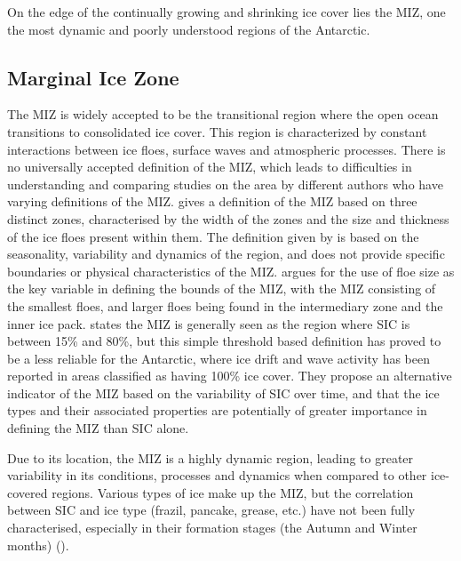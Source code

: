 On the edge of the continually growing and shrinking ice cover lies the \ac{MIZ}, one the most dynamic and poorly understood regions of the Antarctic.

\subsection{Marginal Ice Zone}
\label{subsec:ch2.section2.subsec1}

The \ac{MIZ} is widely accepted to be the transitional region where the open ocean transitions to consolidated ice cover. This region is characterized by constant interactions between ice floes, surface waves and atmospheric processes. There is no universally accepted definition of the \ac{MIZ}, which leads to difficulties in understanding and comparing studies on the area by different authors who have varying definitions of the \ac{MIZ}. \textcite{wadhamsMechanismFormationIce1983} gives a definition of the \ac{MIZ} based on three distinct zones, characterised by the width of the zones and the size and thickness of the ice floes present within them. The definition given by \textcite{squireMarginalIceZone2022} is based on the seasonality, variability and dynamics of the region, and does not provide specific boundaries or physical characteristics of the \ac{MIZ}. \textcite{dayAnalysisAntarcticMarginal2024} argues for the use of floe size as the key variable in defining the bounds of the \ac{MIZ}, with the \ac{MIZ} consisting of the smallest floes, and larger floes being found in the intermediary zone and the inner ice pack. \textcite{vichiIndicatorSeaIce2022} states the \ac{MIZ} is generally seen as the region where \ac{SIC} is between 15\% and 80\%, but this simple threshold based definition has proved to be a less reliable for the Antarctic, where ice drift and wave activity has been reported in areas classified as having 100\% ice cover. They propose an alternative indicator of the \ac{MIZ} based on the variability of \ac{SIC} over time, and that the ice types and their associated properties are potentially of greater importance in defining the \ac{MIZ} than \ac{SIC} alone.

Due to its location, the \ac{MIZ} is a highly dynamic region, leading to greater variability in its conditions, processes and dynamics when compared to other ice-covered regions. Various types of ice make up the \ac{MIZ}, but the correlation between \ac{SIC} and ice type (frazil, pancake, grease, etc.) have not been fully characterised, especially in their formation stages (the Autumn and Winter months) (\cite{vichiIndicatorSeaIce2022}).

